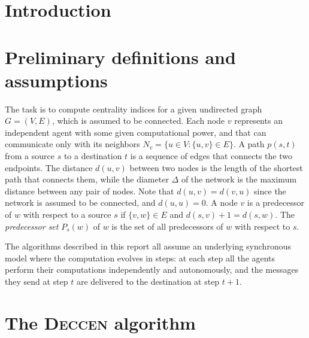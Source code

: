 
\newcommand{\deccen}{\textsc{Deccen}}
\newcommand{\mdisc}{\textsf{{\footnotesize DIS\-CO\-VE\-RY}}}
\newcommand{\mdiscargs}[3]{\mdisc$\langle #1,#2,#3, \sigma_{#1 #2} \rangle$}
\newcommand{\mrep}{\textsf{{\footnotesize REPORT}}}
\newcommand{\mrepargs}[2]{\mrep$\langle #1,#2, \delta(#1|#2), \sigma(#1|#2), \sigma_{#1 #2} \rangle$}
\newcommand{\mrepleaf}[2]{\mrep$\langle #1,#2, 0, 0, \sigma_{#1 #2} \rangle$}

\newcommand{\swait}[1]{\textsf{{\footnotesize WAITING}}$(#1)$}
\newcommand{\sact}[1]{\textsf{{\footnotesize ACTIVE}}$(#1)$}
\newcommand{\scomp}[1]{\textsf{{\footnotesize COMPLETED}}$(#1)$}


\section{Introduction}

\section{Preliminary definitions and assumptions}

The task is to compute centrality indices for a given undirected graph $G = (V,E)$, which is assumed to be connected. Each node $v$ represents an independent agent with some given computational power, and that can communicate only with its neighbors $N_v = \{u \in V : \{u,v\} \in E\}$. A path $p(s,t)$ from a source $s$ to a destination $t$ is a sequence of edges that connects the two endpoints. The distance $d(u,v)$ between two nodes is the length of the shortest path that connects them, while the diameter $\Delta$ of the network is the maximum distance between any pair of nodes. Note that $d(u,v) = d(v,u)$ since the network is assumed to be connected, and $d(u,u) = 0$. A node $v$ is a predecessor of $w$ with respect to a source $s$ if $\{v,w\} \in E$ and $d(s,v) +1 = d(s,w)$. The \emph{predecessor set} $P_s(w)$ of $w$ is the set of all predecessors of $w$ with respect to $s$.

The algorithms described in this report all assume an underlying synchronous model where the computation evolves in steps: at each step all the agents perform their computations independently and autonomously, and the messages they send at step $t$ are delivered to the destination at step $t+1$.

\section{The \deccen{} algorithm}

